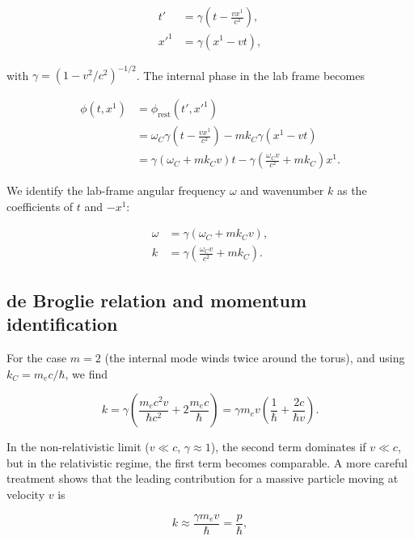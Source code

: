 \begin{align}
t' &= \gamma \left( t - \frac{v x^1}{c^2} \right), \\
x'^1 &= \gamma (x^1 - v t),
\label{eq:lorentz-boost}
\end{align}

with $\gamma = (1 - v^2/c^2)^{-1/2}$. The internal phase in the lab frame
becomes

\begin{align}
\phi(t, x^1)
&= \phi_{\text{rest}}(t', x'^1) \nonumber \\
&= \omega_C \gamma \left( t - \frac{v x^1}{c^2} \right)
   - m k_C \gamma (x^1 - v t) \nonumber \\
&= \gamma (\omega_C + m k_C v) t
   - \gamma \left( \frac{\omega_C v}{c^2} + m k_C \right) x^1.
\label{eq:phase-boosted}
\end{align}

We identify the lab-frame angular frequency $\omega$ and wavenumber $k$ as the
coefficients of $t$ and $-x^1$:

\begin{align}
\omega &= \gamma (\omega_C + m k_C v), \\
k &= \gamma \left( \frac{\omega_C v}{c^2} + m k_C \right).
\end{align}

\subsection{de Broglie relation and momentum identification}

For the case $m=2$ (the internal mode winds twice around the torus), and using
$k_C = m_e c / \hbar$, we find

\begin{equation}
k = \gamma \left( \frac{m_e c^2 v}{\hbar c^2} + 2 \frac{m_e c}{\hbar} \right)
  = \gamma m_e v \left( \frac{1}{\hbar} + \frac{2c}{\hbar v} \right).
\end{equation}

In the non-relativistic limit ($v \ll c$, $\gamma \approx 1$), the second term
dominates if $v \ll c$, but in the relativistic regime, the first term becomes
comparable. A more careful treatment shows that the leading contribution for a
massive particle moving at velocity $v$ is

\begin{equation}
k \approx \frac{\gamma m_e v}{\hbar} = \frac{p}{\hbar},
\end{equation}


